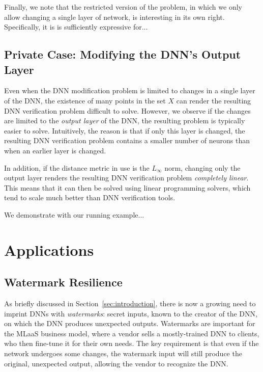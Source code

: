 \documentclass{easychair}
\newcommand{\guy}[1]{\marginpar{\textcolor{orange}{Guy: #1}}}
\begin{document}
Finally, we note that the restricted version of the problem, in which
we only allow changing a single layer of network, is interesting in
its own right. Specifically, it is is sufficiently expressive for...
\guy{TODO: justify why this is interesting}


\subsection{Private Case: Modifying the DNN's Output Layer}
\label{sec:outputLayer}

Even when the DNN modification problem is limited to changes in a
single layer of the DNN, the existence of many points in the set $X$
can render the resulting DNN verification problem difficult to
solve. However,  we observe if the changes are limited to the \emph{output
  layer} of the DNN, the resulting problem is typically easier to
solve. Intuitively, the reason is that if only this layer is changed,
the resulting DNN verification problem contains a smaller number of
neurons than when an earlier layer is changed.

In addition, if the distance metric in use is the $L_\infty$ norm,
changing only the output layer renders the resulting DNN verification
problem \emph{completely linear}. This means that it can then be solved using
linear programming solvers, which tend to scale much better than DNN
verification tools.

We demonstrate with our running example...



\section{Applications}

\subsection{Watermark Resilience}
As briefly discussed in Section~\ref{sec:introduction}, there is now a
growing need to imprint DNNs with \emph{watermarks}: secret inputs,
known to the creator of the DNN, on which the DNN produces unexpected
outputs. Watermarks are important for the MLaaS business model, where
a vendor sells a mostly-trained DNN to clients, who then fine-tune
it for their own needs. The key requirement is that even if the
network undergoes some changes, the watermark input will still produce
the original, unexpected output, allowing the vendor to recognize the
DNN.
\end{document}
